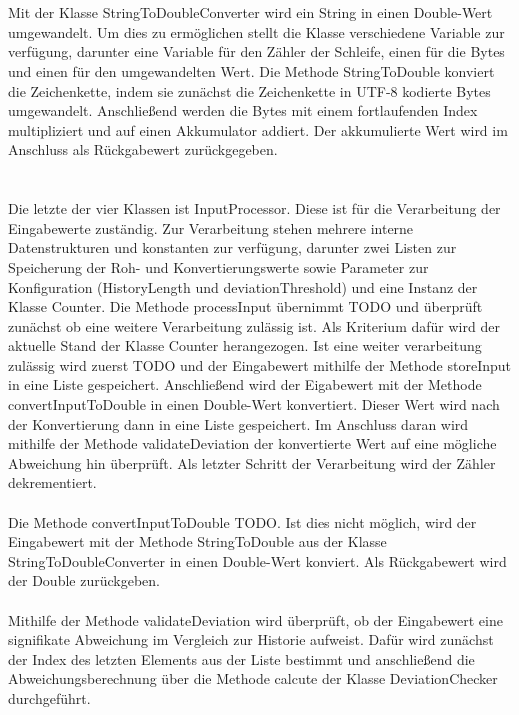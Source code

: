 \documentclass{article}
\begin{document}
    \\
    \\
    Mit der Klasse StringToDoubleConverter wird ein String in einen Double-Wert umgewandelt.
    Um dies zu ermöglichen stellt die Klasse verschiedene Variable zur verfügung, darunter eine Variable für den Zähler der Schleife, einen für die Bytes und einen für den umgewandelten Wert.
    Die Methode StringToDouble konviert die Zeichenkette, indem sie zunächst die Zeichenkette in UTF-8 kodierte Bytes umgewandelt.
    Anschließend werden die Bytes mit einem fortlaufenden Index multipliziert und auf einen Akkumulator addiert.
    Der akkumulierte Wert wird im Anschluss als Rückgabewert zurückgegeben.\\
    \\
    \\
    Die letzte der vier Klassen ist InputProcessor.
    Diese ist für die Verarbeitung der Eingabewerte zuständig.
    Zur Verarbeitung stehen mehrere interne Datenstrukturen und konstanten zur verfügung, darunter zwei Listen zur Speicherung der Roh- und Konvertierungswerte sowie Parameter zur Konfiguration (HistoryLength und deviationThreshold) und eine Instanz der Klasse Counter.
    Die Methode processInput übernimmt TODO und überprüft zunächst ob eine weitere Verarbeitung zulässig ist. 
    Als Kriterium dafür wird der aktuelle Stand der Klasse Counter herangezogen.
    Ist eine weiter verarbeitung zulässig wird zuerst TODO und der Eingabewert mithilfe der Methode storeInput in eine Liste gespeichert.
    Anschließend wird der Eigabewert mit der Methode convertInputToDouble in einen Double-Wert konvertiert.
    Dieser Wert wird nach der Konvertierung dann in eine Liste gespeichert.
    Im Anschluss daran wird mithilfe der Methode validateDeviation der konvertierte Wert auf eine mögliche Abweichung hin überprüft.
    Als letzter Schritt der Verarbeitung wird der Zähler dekrementiert.\\
    \\
    Die Methode convertInputToDouble TODO. Ist dies nicht möglich, wird der Eingabewert mit der Methode StringToDouble aus der Klasse StringToDoubleConverter in einen Double-Wert konviert.
    Als Rückgabewert wird der Double zurückgeben.\\
    \\
    Mithilfe der Methode validateDeviation wird überprüft, ob der Eingabewert eine signifikate Abweichung im Vergleich zur Historie aufweist.
    Dafür wird zunächst der Index des letzten Elements aus der Liste bestimmt und anschließend die Abweichungsberechnung über die Methode calcute der Klasse DeviationChecker durchgeführt.
\end{document}
